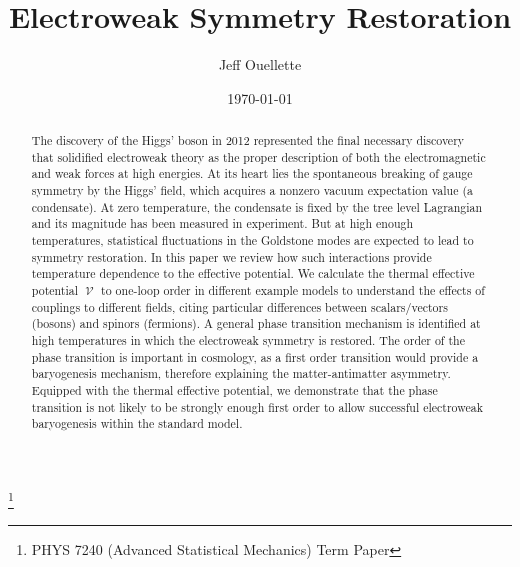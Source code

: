 \documentclass[%
 reprint,
nofootinbib,
 amsmath,amssymb,
 aps,
floatfix,
]{revtex4-1}
\DeclareMathOperator{\V}{\mathcal{V}}
\begin{document}

\title{Electroweak Symmetry Restoration}%
\thanks{PHYS 7240 (Advanced Statistical Mechanics) Term Paper}%

\author{Jeff Ouellette}
%

\date{\today}%

\begin{abstract}
The discovery of the Higgs' boson in 2012 represented the final necessary discovery that solidified electroweak theory as the proper description of both the electromagnetic and weak forces at high energies.
At its heart lies the spontaneous breaking of gauge symmetry by the Higgs' field, which acquires a nonzero vacuum expectation value (a condensate).
At zero temperature, the condensate is fixed by the tree level Lagrangian and its magnitude has been measured in experiment.
But at high enough temperatures, statistical fluctuations in the Goldstone modes are expected to lead to symmetry restoration.
In this paper we review how such interactions provide temperature dependence to the effective potential.
We calculate the thermal effective potential $\V$ to one-loop order in different example models to understand the effects of couplings to different fields, citing particular differences between scalars/vectors (bosons) and spinors (fermions).
A general phase transition mechanism is identified at high temperatures in which the electroweak symmetry is restored.
The order of the phase transition is important in cosmology, as a first order transition would provide a baryogenesis mechanism, therefore explaining the matter-antimatter asymmetry.
Equipped with the thermal effective potential, we demonstrate that the phase transition is not likely to be strongly enough first order to allow successful electroweak baryogenesis within the standard model.
\end{abstract}

\maketitle
\end{document}

